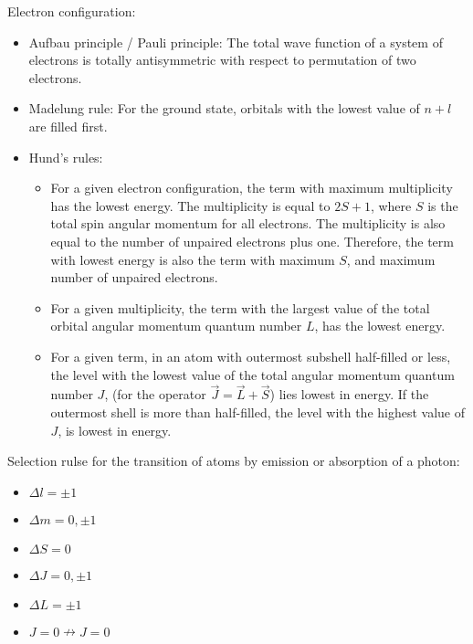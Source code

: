 			\noindent
			Electron configuration:
			\begin{itemize}
				\item Aufbau principle / Pauli principle: The total wave function of a system of electrons is totally antisymmetric with respect to permutation of two electrons.
				\item Madelung rule: For the ground state, orbitals with the lowest value of $n+l$ are filled first.
				\item Hund's rules:
				\begin{itemize}
					\item For a given electron configuration, the term with maximum multiplicity has the lowest energy. The multiplicity is equal to $2S+1$, where $S$ is the total spin angular momentum for all electrons. The multiplicity is also equal to the number of unpaired electrons plus one. Therefore, the term with lowest energy is also the term with maximum $S$, and maximum number of unpaired electrons.
					\item For a given multiplicity, the term with the largest value of the total orbital angular momentum quantum number  $L$, has the lowest energy.
					\item For a given term, in an atom with outermost subshell half-filled or less, the level with the lowest value of the total angular momentum quantum number  $J$, (for the operator $\vec{J} = \vec{L} + \vec{S}$) lies lowest in energy. If the outermost shell is more than half-filled, the level with the highest value of  $J$, is lowest in energy.
				\end{itemize}
			\end{itemize}

			\noindent
			Selection rulse for the transition of atoms by emission or absorption of a photon:
			\begin{itemize}
				\item $\Delta l = \pm 1$
				\item $\Delta m = 0, \pm 1$
				\item $\Delta S = 0$
				\item $\Delta J = 0, \pm 1$
				\item $\Delta L = \pm 1$
				\item $J=0 \nrightarrow J=0$
			\end{itemize}

